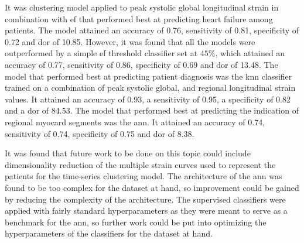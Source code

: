 It was clustering model applied to peak systolic global longitudinal strain in combination with \acrshort{ef} that performed best at predicting heart failure among patients. The model attained an accuracy of 0.76, sensitivity of 0.81, specificity of 0.72 and \acrshort{dor} of 10.85. However, it was found that all the models were outperformed by a simple \acrshort{ef} threshold classifier set at $45\%$, which attained an accuracy of 0.77, sensitivity of 0.86, specificity of 0.69 and \acrshort{dor} of 13.48. The model that performed best at predicting patient diagnosis was the \acrlong{knn} classifier trained on a combination of peak systolic global, and regional longitudinal strain values. It attained an accuracy of 0.93, a sensitivity of 0.95, a specificity of 0.82 and a \acrshort{dor} of 84.53. The model that performed best at predicting the indication of regional myocard segments was the \acrshort{ann}. It attained an accuracy of 0.74, sensitivity of 0.74, specificity of 0.75 and \acrshort{dor} of 8.38. \bigskip

It was found that future work to be done on this topic could include dimensionality reduction of the multiple strain curves used to represent the patients for the time-series clustering model. The architecture of the \acrshort{ann} was found to be too complex for the dataset at hand, so improvement could be gained by reducing the complexity of the architecture. The supervised classifiers were applied with fairly standard hyperparameters as they were meant to serve as a benchmark for the \acrshort{ann}, so further work could be put into optimizing the hyperparameters of the classifiers for the dataset at hand.

\clearpage
